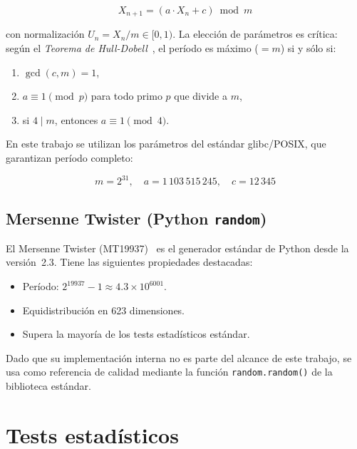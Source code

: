 \documentclass{article}
\begin{document}
\begin{equation}
  X_{n+1} = (a \cdot X_n + c) \bmod m
  \label{eq:gcl}
\end{equation}

con normalización $U_n = X_n / m \in [0,1)$.
La elección de parámetros es crítica: según el \emph{Teorema de
Hull-Dobell}~\cite{hull1962}, el período es máximo ($= m$) si y sólo si:
\begin{enumerate}
  \item $\gcd(c, m) = 1$,
  \item $a \equiv 1 \pmod{p}$ para todo primo $p$ que divide a $m$,
  \item si $4 \mid m$, entonces $a \equiv 1 \pmod{4}$.
\end{enumerate}

En este trabajo se utilizan los parámetros del estándar glibc/POSIX,
que garantizan período completo:

\begin{equation}
  m = 2^{31},\quad a = 1\,103\,515\,245,\quad c = 12\,345
  \label{eq:gcl_params}
\end{equation}

\subsection{Mersenne Twister (Python \texttt{random})}

El Mersenne Twister (MT19937)~\cite{matsumoto1998} es el generador
estándar de Python desde la versión~2.3.  Tiene las siguientes
propiedades destacadas:

\begin{itemize}
  \item Período: $2^{19937} - 1 \approx 4.3 \times 10^{6001}$.
  \item Equidistribución en 623 dimensiones.
  \item Supera la mayoría de los tests estadísticos estándar.
\end{itemize}

Dado que su implementación interna no es parte del alcance de este trabajo,
se usa como referencia de calidad mediante la función
\texttt{random.random()} de la biblioteca estándar.

\section{Tests estadísticos}
\end{document}
